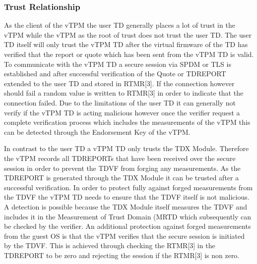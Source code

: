 \documentclass[sigplan,screen,nonacm]{acmart}
\begin{document}
\subsubsection{Trust Relationship}
As the client of the vTPM the user TD generally places a lot of trust in the vTPM while the vTPM as the root of trust does not trust the user TD.
The user TD itself will only trust the vTPM TD after the virtual firmware of the TD has verified that the report or quote which has been sent from the vTPM TD is valid.
To communicate with the vTPM TD a secure session via SPDM or TLS is established and after successful verification of the Quote or TDREPORT extended to the user TD and stored in RTMR[3].
If the connection however should fail a random value is written to RTMR[3] in order to indicate that the connection failed.
Due to the limitations of the user TD it can generally not verify if the vTPM TD is acting malicious however once the verifier request a complete verification process which includes the measurements of the vTPM this can be detected through the Endorsement Key of the vTPM.

In contrast to the user TD a vTPM TD only trusts the TDX Module.
Therefore the vTPM records all TDREPORTs that have been received over the secure session in order to prevent the TDVF from forging any measurements.
As the TDREPORT is generated through the TDX Module it can be trusted after a successful verification.
In order to protect fully against forged measurements from the TDVF the vTPM TD needs to ensure that the TDVF itself is not malicious.
A detection is possible because the TDX Module itself measures the TDVF and includes it in the Measurement of Trust Domain (MRTD which subsequently can be checked by the verifier.
An additional protection against forged measurements from the guest OS is that the vTPM verifies that the secure session is initiated by the TDVF.
This is achieved through checking the RTMR[3] in the TDREPORT to be zero and rejecting the session if the RTMR[3] is non zero.
\end{document}

